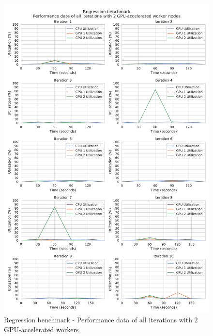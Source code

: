 \begin{figure}[h]
\centering
\includegraphics[scale=0.5]{images/appendix/evaluation_data/regression_benchmark/regression_gpu2_performance}
\caption{Regression benchmark - Performance data of all iterations with 2 GPU-accelerated workers}
\label{fig:appendix_eval_regression_gpu2}
\end{figure}

